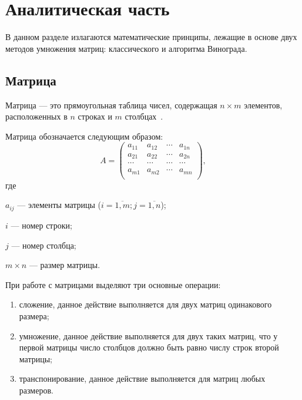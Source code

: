 \chapter{Аналитическая часть}

В данном разделе излагаются математические принципы, лежащие в основе двух методов умножения матриц: классического и алгоритма Винограда.

\section{Матрица}
Матрица — это прямоугольная таблица чисел, содержащая \(n \times m\) элементов, расположенных в \(n\) строках и \(m\) столбцах~\cite{matrix_def}.

Матрица обозначается следующим образом:
\begin{equation}
	A=\begin{pmatrix}
		a_{11} & a_{12} & \cdots & a_{1n} \\
		a_{21} & a_{22} & \cdots & a_{2n} \\
		\cdots & \cdots & \cdots & \cdots \\
		a_{m1} & a_{m2} & \cdots & a_{mn} \\
	\end{pmatrix},
\end{equation}
\noindent где

$a_{ij}$ --- элементы матрицы ($i=\overline{1,m}; j=\overline{1,n}$);

$i$ --- номер строки;

$j$ --- номер столбца;

$m \times n$ --- размер матрицы.

При работе с матрицами выделяют три основные операции:
\begin{enumerate}
	\item сложение, данное действие выполняется для двух матриц одинакового размера;
	\item умножение, данное действие выполняется для двух таких матриц, что у первой матрицы число столбцов должно быть равно числу строк второй матрицы;
	\item транспонирование, данное действие выполняется для матриц любых размеров.
\end{enumerate}


